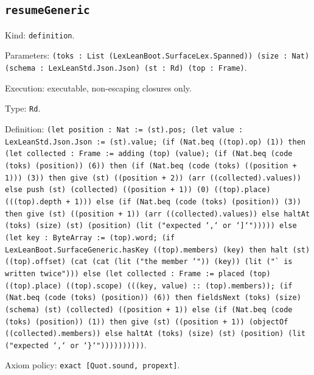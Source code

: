 \documentclass[11pt]{article}
\begin{document}
\subsection*{\texttt{resumeGeneric}}
\noindent Kind: \texttt{definition}.\par
\noindent Parameters: \texttt{(toks : List (LexLeanBoot.SurfaceLex.Spanned)) (size : Nat) (schema : LexLeanStd.Json.Json) (st : Rd) (top : Frame)}.\par
\noindent Execution: executable, non-escaping closures only.\par
\noindent Type: \texttt{Rd}.\par
\noindent Definition: \texttt{(let position : Nat := (st).pos; (let value : LexLeanStd.Json.Json := (st).value; (if (Nat.beq ((top).op) (1)) then (let collected : Frame := adding (top) (value); (if (Nat.beq (code (toks) (position)) (6)) then (if (Nat.beq (code (toks) ((position + 1))) (3)) then give (st) ((position + 2)) (arr ((collected).values)) else push (st) (collected) ((position + 1)) (0) ((top).place) (((top).depth + 1))) else (if (Nat.beq (code (toks) (position)) (3)) then give (st) ((position + 1)) (arr ((collected).values)) else haltAt (toks) (size) (st) (position) (lit ("expected `,` or `]`"))))) else (let key : ByteArray := (top).word; (if LexLeanBoot.SurfaceGeneric.hasKey ((top).members) (key) then halt (st) ((top).offset) (cat (cat (lit ("the member `")) (key)) (lit ("` is written twice"))) else (let collected : Frame := placed (top) ((top).place) ((top).scope) (((key, value) :: (top).members)); (if (Nat.beq (code (toks) (position)) (6)) then fieldsNext (toks) (size) (schema) (st) (collected) ((position + 1)) else (if (Nat.beq (code (toks) (position)) (1)) then give (st) ((position + 1)) (objectOf ((collected).members)) else haltAt (toks) (size) (st) (position) (lit ("expected `,` or `\}`"))))))))))}.\par
\noindent Axiom policy: \texttt{exact [Quot.sound, propext]}.\par
\end{document}
